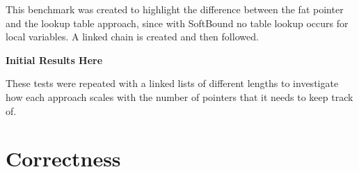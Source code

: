 This benchmark was created to highlight the difference between the fat pointer and the lookup table approach, since with SoftBound no table lookup occurs for local variables.
A linked chain is created and then followed.

\textbf{Initial Results Here}

These tests were repeated with a linked lists of different lengths to investigate how each approach scales with the number of pointers that it needs to keep track of.



\section{Correctness}








